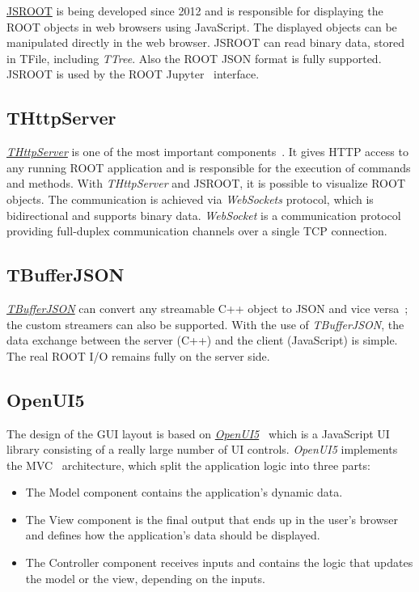 \documentclass[a4paper]{jpconf}
\begin{document}
\href{https://github.com/root-project/jsroot/}{JSROOT} is being developed since
2012 and is responsible for displaying the ROOT objects in web browsers using
JavaScript. The displayed objects can be manipulated directly in
the web browser. JSROOT can read binary data, stored in TFile, including \textit{TTree}.
Also the ROOT JSON format is fully supported. JSROOT is used by the ROOT Jupyter~\cite{jupyter} interface.

\subsection{THttpServer}

\href{https://github.com/root-project/jsroot/blob/master/docs/HttpServer.md}{{\it THttpServer}} is
one of the most important components~\cite{http}. It gives HTTP access to any running ROOT application
and is responsible for the execution of commands and methods. With {\it THttpServer}
and JSROOT, it is possible to visualize ROOT objects. The communication is achieved
via \textit{WebSockets} protocol, which is bidirectional and supports binary data. \textit{WebSocket}
is a communication protocol providing full-duplex communication channels over a
single TCP connection.

\subsection{TBufferJSON}

\href{https://root.cern/doc/master/classTBufferJSON.html}{\textit{TBufferJSON}} can convert
any streamable C++ object to JSON and vice versa~\cite{buffer}; the custom streamers
can also be supported. With the use of \textit{TBufferJSON}, the data exchange between the server (C++)
and the client (JavaScript) is simple. The real ROOT I/O remains fully on the server side.

\subsection{OpenUI5}
The design of the GUI layout is based on \textit{\href{https://openui5.hana.ondemand.com/}{OpenUI5}}~\cite{openui}
which is a JavaScript UI library consisting of a really large number of UI controls.
\textit{OpenUI5} implements the MVC~\cite{mvc} architecture, which split
the application logic into three parts:
\begin{itemize}
  \item The Model component contains the application's dynamic data.
  \item The View component is the final output that ends up in the user's browser and defines how the application's data should be displayed.
  \item The Controller component receives inputs and contains the logic that updates the model or the view, depending on the inputs.
\end{itemize}
\end{document}
